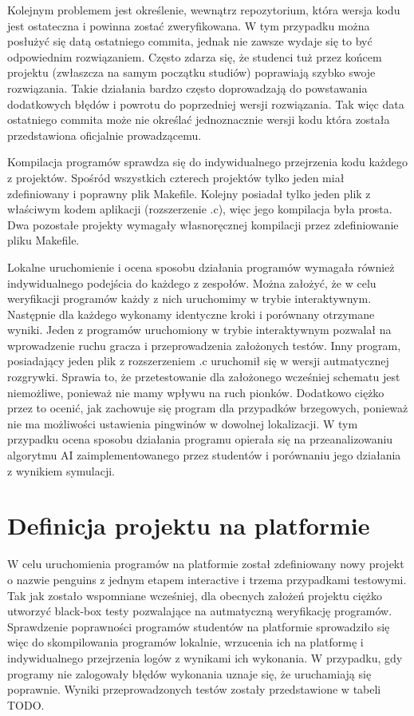 Kolejnym problemem jest określenie, wewnątrz repozytorium, która wersja kodu jest ostateczna i powinna zostać zweryfikowana.
W tym przypadku można posłużyć się datą ostatniego commita, jednak nie zawsze wydaje się to być odpowiednim rozwiązaniem.
Często zdarza się, że studenci tuż przez końcem projektu (zwłaszcza na samym początku studiów) poprawiają szybko swoje rozwiązania.
Takie działania bardzo często doprowadzają do powstawania dodatkowych błędów i powrotu do poprzedniej wersji rozwiązania.
Tak więc data ostatniego commita może nie określać jednoznacznie wersji kodu która została przedstawiona oficjalnie prowadzącemu.

Kompilacja programów sprawdza się do indywidualnego przejrzenia kodu każdego z projektów.
Spośród wszystkich czterech projektów tylko jeden miał zdefiniowany i poprawny plik Makefile.
Kolejny posiadał tylko jeden plik z właściwym kodem aplikacji (rozszerzenie .c), więc jego kompilacja była prosta.
Dwa pozostałe projekty wymagały własnoręcznej kompilacji przez zdefiniowanie pliku Makefile.

Lokalne uruchomienie i ocena sposobu działania programów wymagała również indywidualnego podejścia do każdego z zespołów.
Można założyć, że w celu weryfikacji programów każdy z nich uruchomimy w trybie interaktywnym.
Następnie dla każdego wykonamy identyczne kroki i porównany otrzymane wyniki.
Jeden z programów uruchomiony w trybie interaktywnym pozwalał na wprowadzenie ruchu gracza i przeprowadzenia założonych testów.
Inny program, posiadający jeden plik z rozszerzeniem .c uruchomił się w wersji autmatycznej rozgrywki.
Sprawia to, że przetestowanie dla założonego wcześniej schematu jest niemożliwe, ponieważ nie mamy wpływu na ruch pionków.
Dodatkowo ciężko przez to ocenić, jak zachowuje się program dla przypadków brzegowych, ponieważ nie ma możliwości ustawienia pingwinów w dowolnej lokalizacji.
W tym przypadku ocena sposobu działania programu opierała się na przeanalizowaniu algorytmu AI zaimplementowanego przez studentów i porównaniu jego działania z wynikiem symulacji.


\section{Definicja projektu na platformie}

W celu uruchomienia programów na platformie został zdefiniowany nowy projekt o nazwie penguins z jednym etapem interactive i trzema przypadkami testowymi.
Tak jak zostało wspomniane wcześniej, dla obecnych założeń projektu ciężko utworzyć black-box testy pozwalające na autmatyczną weryfikację programów.
Sprawdzenie poprawności programów studentów na platformie sprowadziło się więc do skompilowania programów lokalnie, wrzucenia ich na platformę i indywidualnego przejrzenia logów z wynikami ich wykonania.
W przypadku, gdy programy nie zalogowały błędów wykonania uznaje się, że uruchamiają się poprawnie.
Wyniki przeprowadzonych testów zostały przedstawione w tabeli TODO.



